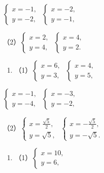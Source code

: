 \(\left\{ \begin{array}{l} x = -1, \\ y = -2, \end{array} \right.\) \(\left\{ \begin{array}{l} x = -2, \\ y = -1, \end{array} \right.\)

（2）\(\left\{ \begin{array}{l} x = 2, \\ y = 4, \end{array} \right.\) \(\left\{ \begin{array}{l} x = 4, \\ y = 2. \end{array} \right.\)

\begin{enumerate}[start=6]
\item
  （1）\(\left\{ \begin{array}{l} x = 6, \\ y = 3, \end{array} \right.\) \(\left\{ \begin{array}{l} x = 4, \\ y = 5, \end{array} \right.\)
\end{enumerate}

\(\left\{ \begin{array}{l} x = -1, \\ y = -4, \end{array} \right.\) \(\left\{ \begin{array}{l} x = -3, \\ y = -2, \end{array} \right.\)

（2）\(\left\{ \begin{array}{l} x = \frac{\sqrt{5}}{2}, \\ y = \sqrt{5}, \end{array} \right.\) \(\left\{ \begin{array}{l} x = -\frac{\sqrt{5}}{2}, \\ y = -\sqrt{5}. \end{array} \right.\)

\begin{enumerate}[start=7]
\item
  （1）\(\left\{ \begin{array}{l} x = 10, \\ y = 6, \end{array} \right.\)
\end{enumerate}

